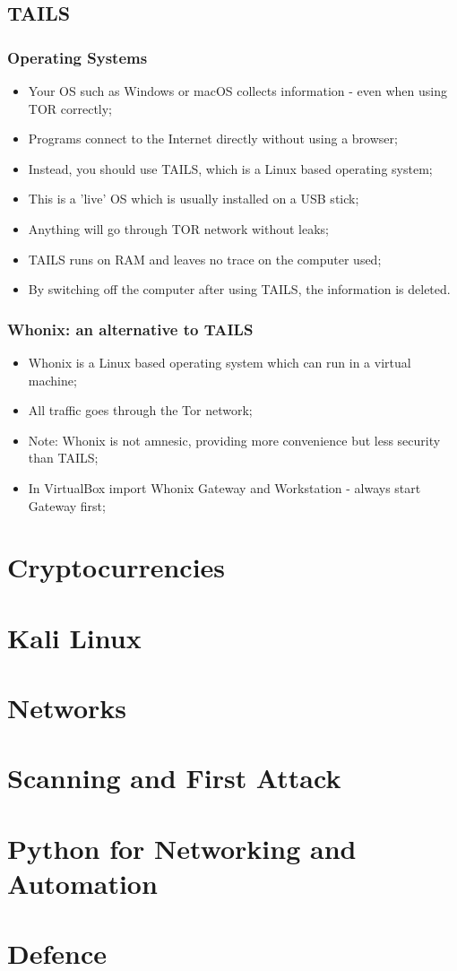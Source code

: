 \documentclass[11pt,a4paper]{report}
\begin{document}
\section{TAILS}
\subsection{Operating Systems}
\begin{itemize}
    \item Your OS such as Windows or macOS collects information - even when using TOR correctly;
    \item Programs connect to the Internet directly without using a browser;
    \item Instead, you should use TAILS, which is a Linux based operating system;
    \item This is a 'live' OS which is usually installed on a USB stick;
    \item Anything will go through TOR network without leaks;
    \item TAILS runs on RAM and leaves no trace on the computer used;
    \item By switching off the computer after using TAILS, the information is deleted.
\end{itemize}
\subsection{Whonix: an alternative to TAILS}
\begin{itemize}
    \item Whonix is a Linux based operating system which can run in a virtual machine;
    \item All traffic goes through the Tor network;
    \item Note: Whonix is not amnesic, providing more convenience but less security than TAILS;
    \item In VirtualBox import Whonix Gateway and Workstation - always start Gateway first;
\end{itemize}

\chapter{Cryptocurrencies}
\chapter{Kali Linux}
\chapter{Networks}
\chapter{Scanning and First Attack}
\chapter{Python for Networking and Automation}
\chapter{Defence}
\end{document}
